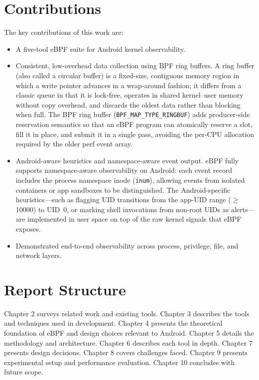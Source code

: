 \documentclass{mnitjaipur}
\begin{document}
\section{Contributions}
The key contributions of this work are:
\begin{itemize}
  \item A five-tool eBPF suite for Android kernel observability.
  \item Consistent, low-overhead data collection using BPF ring buffers. A ring buffer (also called a circular buffer) is a fixed-size, contiguous memory region in which a write pointer advances in a wrap-around fashion; it differs from a classic queue in that it is lock-free, operates in shared kernel--user memory without copy overhead, and discards the oldest data rather than blocking when full. The BPF ring buffer (\texttt{BPF\_MAP\_TYPE\_RINGBUF}) adds producer-side reservation semantics so that an eBPF program can atomically reserve a slot, fill it in place, and submit it in a single pass, avoiding the per-CPU allocation required by the older perf event array.
  \item Android-aware heuristics and namespace-aware event output. eBPF fully supports namespace-aware observability on Android: each event record includes the process namespace inode (\texttt{inum}), allowing events from isolated containers or app sandboxes to be distinguished. The Android-specific heuristics—such as flagging UID transitions from the app-UID range ($\geq$10000) to UID~0, or marking shell invocations from non-root UIDs as alerts—are implemented in user space on top of the raw kernel signals that eBPF exposes.
  \item Demonstrated end-to-end observability across process, privilege, file, and network layers.
\end{itemize}

\section{Report Structure}
Chapter 2 surveys related work and existing tools. Chapter 3 describes the tools and techniques used in development. Chapter 4 presents the theoretical foundation of eBPF and design choices relevant to Android. Chapter 5 details the methodology and architecture. Chapter 6 describes each tool in depth. Chapter 7 presents design decisions. Chapter 8 covers challenges faced. Chapter 9 presents experimental setup and performance evaluation. Chapter 10 concludes with future scope.
\end{document}
